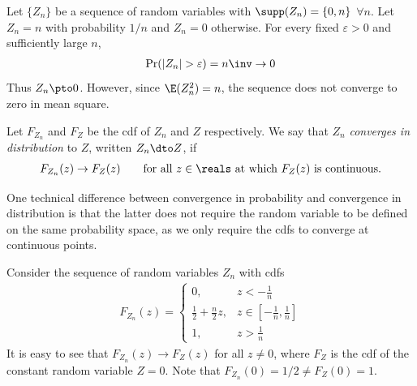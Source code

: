 \documentclass[a4paper,12pt]{article}
\begin{document}
\begin{example}\label{ex-p-not-ms}
	Let $\{Z_n\}$ be a sequence of random variables with $\supp(Z_n)=\{0,n\}$ $\forall n$.
	Let $Z_n=n$ with probability $1/n$ and $Z_n=0$ otherwise.
	For every fixed $\varepsilon>0$ and sufficiently large $n$,
	\begin{align*}
		\Pr(|Z_n|>\varepsilon)=n\inv\to0
	\end{align*}
	Thus $Z_n\pto0$.
	However, since $\E(Z_n^2)=n$, the sequence does not converge to zero in mean square.
\end{example}

\begin{definition}\label{def-distribution-convergence}
	Let $F_{Z_n}$ and $F_Z$ be the \gls{cdf} of $Z_n$ and $Z$ respectively.
	We say that $Z_n$ \emph{converges in distribution} to $Z$, written $Z_n\dto Z$, if
	\begin{align}
		F_{Z_n}(z)\to F_Z(z)
		\qquad\text{for all }z\in\reals\text{ at which }F_Z(z)\text{ is continuous}.
	\end{align}
\end{definition}

\begin{remark}
	One technical difference between convergence in probability and convergence in distribution is that
	the latter does not require the random variable to be defined on the same probability space,
	as we only require the \glspl{cdf} to converge at continuous points.
\end{remark}

\begin{example}
	Consider the sequence of random variables $Z_n$ with \glspl{cdf}
	\begin{align}
		F_{Z_n}(z) =
		\begin{cases}
			0, & z < -\frac1n \\
			\frac12 + \frac{n}{2} z, & z \in \left[-\frac1n,\frac1n\right] \\
			1, & z > \frac1n
		\end{cases}
	\end{align}
	It is easy to see that $F_{Z_n}(z)\to F_Z(z)$ for all $z\neq0$, where $F_Z$ is the \gls{cdf} of the constant random variable $Z=0$.
	Note that $F_{Z_n}(0)=1/2\neq F_Z(0)=1$.
\end{example}
\end{document}
